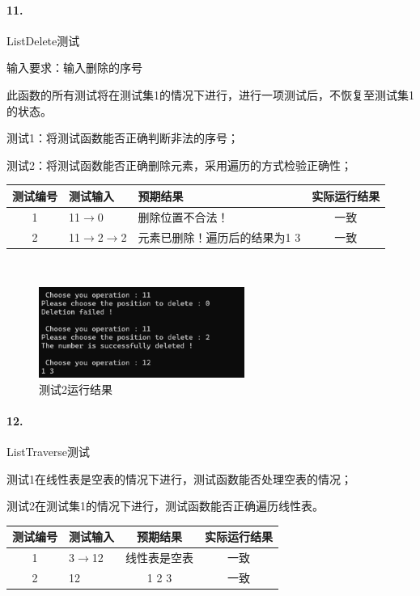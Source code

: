 \documentclass[supercite]{Experimental_Report}
\theoremstyle{definition}
\begin{document}
\paragraph{11.}ListDelete测试

	输入要求：输入删除的序号

	此函数的所有测试将在测试集1的情况下进行，进行一项测试后，不恢复至测试集1的状态。

	测试1：将测试函数能否正确判断非法的序号；

	测试2：将测试函数能否正确删除元素，采用遍历的方式检验正确性；


\vspace{0.5em}

\begin{tabular}{|c|p{2.7cm}|p{4.5cm}|c|}
	\hline
	测试编号 & 测试输入 & 预期结果 & 实际运行结果 \\
	\hline
	1 & 11$\rightarrow$0 & 删除位置不合法！ & 一致 \\
	\hline
	2 & 11$\rightarrow$2$\rightarrow$2 & 元素已删除！遍历后的结果为1 3 & 一致 \\
	\hline
\end{tabular}

~\

 \begin{figure}[H]
 	\centering
 	\includegraphics[width=0.6\textwidth]{images/线性表测试11.png}
 	\caption{测试2运行结果}
 	\label{txlab}
 \end{figure}


\paragraph{12.}ListTraverse测试

	测试1在线性表是空表的情况下进行，测试函数能否处理空表的情况；

	测试2在测试集1的情况下进行，测试函数能否正确遍历线性表。

\vspace{0.5em}

\begin{tabular}{|c|p{2.7cm}|c|c|}
	\hline
	测试编号 & 测试输入 & 预期结果 & 实际运行结果 \\
	\hline
	1 & 3$\rightarrow$12 & 线性表是空表 & 一致 \\
	\hline
	2 & 12 & 1 2 3 & 一致 \\
	\hline
\end{tabular}
\end{document}
